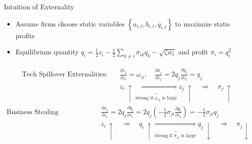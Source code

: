 \documentclass[
  10pt,
  aspectratio=169,   %
]{beamer}
\theoremstyle{plain}
\begin{document}
\begin{frame}{Intuition of Externality}
  \label{static_equilibrium}
  \begin{itemize}
    \item Assume firms choose static variables $\left\{a_{i,t}, b_{i,t}, q_{i,t}\right\}$ to maximize static profits \pause
    \item Equilibrium quantity $q_i = \frac{1}{2} z_i - \frac{1}{2}\sum_{k \neq i} \sigma_{ik} q_k - \sqrt{\zeta w_t}$ and profit $\pi_i = q_i^2$ \pause
  \end{itemize}
  \begin{align*}
    \text{Tech Spillover Externalities:} \quad &
    \frac{\partial \dot{z}_j}{\partial z_i} = \omega_{ij}, \quad
    \frac{\partial \pi_j}{\partial z_j} = 2 q_j \frac{\partial q_j}{\partial z_j} = q_j \\
    & z_i \ \uparrow \underbrace{\Longrightarrow}_{\text{strong if } \omega_{ij} \text{ is large}}   z_j \ \uparrow \quad \Longrightarrow \quad \pi_j \ \uparrow
  \end{align*}\pause
  \begin{align*}
    \text{Business Stealing Externalities:} \quad &
    \frac{\partial \pi_j}{\partial z_i} = 2 q_j \frac{\partial q_j}{\partial z_i}
    = 2 q_j \left(-\frac{1}{2}\sigma_{ji}\frac{\partial q_i}{\partial z_i}\right)
    = -\frac{1}{2}\sigma_{ji} q_j \\
    & z_i \ \uparrow \quad \Longrightarrow \quad q_i \ \uparrow \underbrace{\Longrightarrow}_{\text{strong if } \sigma_{ij} \text{ is large}} q_j \ \downarrow \quad \Longrightarrow \quad \pi_j  \downarrow
  \end{align*}
\end{frame}
\end{document}

